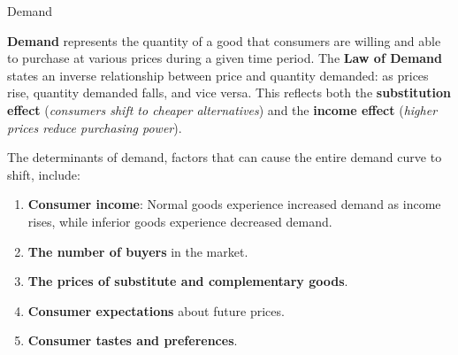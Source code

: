 \documentclass[10pt]{article}
\begin{document}
  \begin{core}{Demand}

    \textbf{Demand} represents the quantity of a good that consumers are willing and able to purchase at various prices during a given time period. The \textbf{Law of Demand} states an inverse relationship between price and quantity demanded: as prices rise, quantity demanded falls, and vice versa. This reflects both the \textbf{substitution effect} (\textit{consumers shift to cheaper alternatives}) and the \textbf{income effect} (\textit{higher prices reduce purchasing power}).


    The determinants of demand, factors that can cause the entire demand curve to shift, include:

    \begin{enumerate}

      \item \textbf{Consumer income}: Normal goods experience increased demand as income rises, while inferior goods experience decreased demand.

      \item \textbf{The number of buyers} in the market.

      \item \textbf{The prices of substitute and complementary goods}.

      \item \textbf{Consumer expectations} about future prices.

      \item \textbf{Consumer tastes and preferences}.

    \end{enumerate}

  \end{core}
    
\end{document}
